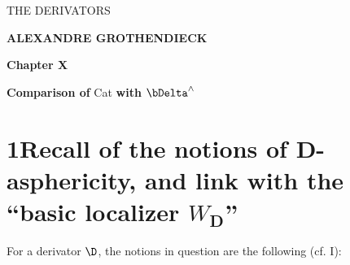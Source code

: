 \printedpage{}

\begin{center}
{\LARGE \textsf{THE DERIVATORS}}

\bigskip

{\large \textbf{ALEXANDRE GROTHENDIECK}}

\vspace{3em}

{\large \textbf{Chapter X}}

\medskip

{\large \textbf{Comparison of} Cat \textbf{with} $\bDelta^{\wedge}$}
\end{center}

\clearpage

\printedpage{}


\clearpage



\section*{1\quad Recall of the notions of D-asphericity, and link with the ``basic localizer $W_{\mathbf{D}}$''}

For a derivator $\D$, the notions in question are the following (cf. I):

